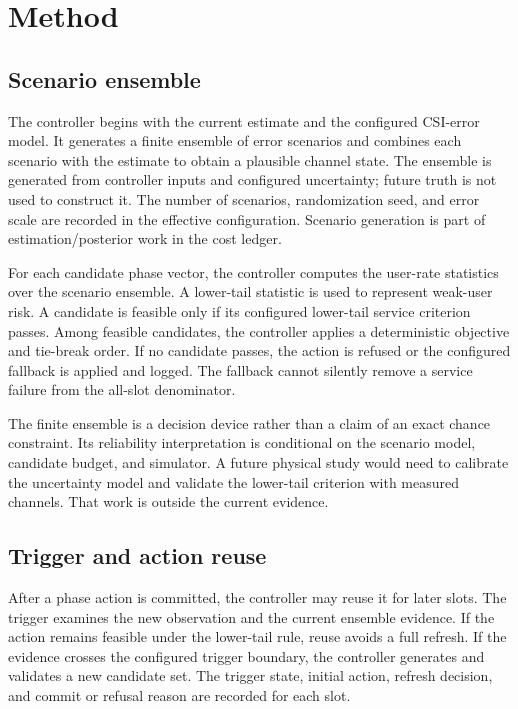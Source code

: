 \documentclass[10pt,twocolumn]{article}
\begin{document}
\section{Method}\label{method}

\subsection{Scenario ensemble}\label{scenario-ensemble}

The controller begins with the current estimate and the configured
CSI-error model. It generates a finite ensemble of error scenarios and
combines each scenario with the estimate to obtain a plausible channel
state. The ensemble is generated from controller inputs and configured
uncertainty; future truth is not used to construct it. The number of
scenarios, randomization seed, and error scale are recorded in the
effective configuration. Scenario generation is part of
estimation/posterior work in the cost ledger.

For each candidate phase vector, the controller computes the user-rate
statistics over the scenario ensemble. A lower-tail statistic is used to
represent weak-user risk. A candidate is feasible only if its configured
lower-tail service criterion passes. Among feasible candidates, the
controller applies a deterministic objective and tie-break order. If no
candidate passes, the action is refused or the configured fallback is
applied and logged. The fallback cannot silently remove a service
failure from the all-slot denominator.

The finite ensemble is a decision device rather than a claim of an exact
chance constraint. Its reliability interpretation is conditional on the
scenario model, candidate budget, and simulator. A future physical study
would need to calibrate the uncertainty model and validate the
lower-tail criterion with measured channels. That work is outside the
current evidence.

\subsection{Trigger and action
reuse}\label{trigger-and-action-reuse}

After a phase action is committed, the controller may reuse it for later
slots. The trigger examines the new observation and the current ensemble
evidence. If the action remains feasible under the lower-tail rule,
reuse avoids a full refresh. If the evidence crosses the configured
trigger boundary, the controller generates and validates a new candidate
set. The trigger state, initial action, refresh decision, and commit or
refusal reason are recorded for each slot.
\end{document}
